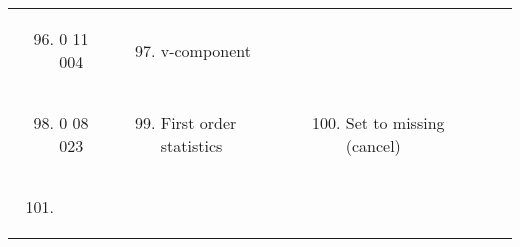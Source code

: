 \begin{longtable}[]{@{}llll@{}}
\begin{minipage}[t]{0.22\columnwidth}\raggedright
\strut
\end{minipage} & \begin{minipage}[t]{0.22\columnwidth}\raggedright
\begin{enumerate}
\setcounter{enumi}{95}
\item
  0 11 004
\end{enumerate}\strut
\end{minipage} & \begin{minipage}[t]{0.22\columnwidth}\raggedright
\begin{enumerate}
\setcounter{enumi}{96}
\item
  v-component
\end{enumerate}\strut
\end{minipage} & \begin{minipage}[t]{0.22\columnwidth}\raggedright
\strut
\end{minipage}\tabularnewline
\begin{minipage}[t]{0.22\columnwidth}\raggedright
\strut
\end{minipage} & \begin{minipage}[t]{0.22\columnwidth}\raggedright
\begin{enumerate}
\setcounter{enumi}{97}
\item
  0 08 023
\end{enumerate}\strut
\end{minipage} & \begin{minipage}[t]{0.22\columnwidth}\raggedright
\begin{enumerate}
\setcounter{enumi}{98}
\item
  First order statistics
\end{enumerate}\strut
\end{minipage} & \begin{minipage}[t]{0.22\columnwidth}\raggedright
\begin{enumerate}
\setcounter{enumi}{99}
\item
  Set to missing (cancel)
\end{enumerate}\strut
\end{minipage}\tabularnewline
\begin{minipage}[t]{0.22\columnwidth}\raggedright
\strut
\end{minipage} & \begin{minipage}[t]{0.22\columnwidth}\raggedright
\begin{enumerate}
\setcounter{enumi}{100}
\item

\end{enumerate}
\end{minipage}
\end{longtable}
